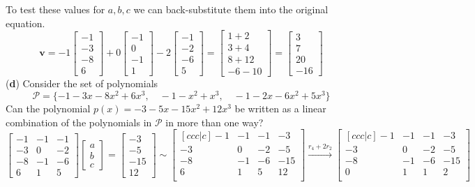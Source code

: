 \documentclass[12pt]{article}
\begin{document}
To test these values for $a,b,c$ we can back-substitute them into the original equation.
$$
\mathbf{v}=
-1
\begin{bmatrix}
   -1 \\
   -3 \\
   -8 \\
   6
\end{bmatrix}
+0
\begin{bmatrix}
   -1 \\
   0 \\
   -1 \\
   1
\end{bmatrix}
-2
\begin{bmatrix}
   -1 \\
   -2 \\
   -6 \\
   5
\end{bmatrix}
=
\begin{bmatrix}
   1 + 2 \\
   3 + 4 \\
   8 + 12 \\
   -6 -10
\end{bmatrix}
=
\begin{bmatrix}
   3 \\
   7 \\
   20 \\
   -16
\end{bmatrix}
$$
(\textbf{d}) Consider the set of polynomials
$$
\mathcal{P}=\{-1-3x-8x^2+6x^3,\quad -1-x^2+x^3,\quad -1-2x-6x^2+5x^3\}
$$
Can the polynomial $p(x)=-3-5x-15x^2+12x^3$ be written as a linear combination of the polynomials in $\mathcal{P}$ in more than one way? 
$$
\begin{bmatrix}
   -1 & -1 & -1\\
   -3 & 0 & -2\\
   -8 & -1 & -6\\
   6 & 1 & 5
\end{bmatrix}
\begin{bmatrix}
  a \\
  b \\
  c
\end{bmatrix}
=
\begin{bmatrix}
   -3 \\
   -5 \\
   -15 \\
   12 
\end{bmatrix}
\sim
\begin{bmatrix}[ccc|c]
   -1 & -1 & -1 & -3 \\
   -3 & 0 & -2 & -5 \\
   -8 & -1 & -6 & -15 \\
   6 & 1 & 5 & 12 \\
\end{bmatrix} \overset{r_4+2r_2}{\longrightarrow}
\begin{bmatrix}[ccc|c]
   -1 & -1 & -1 & -3 \\
   -3 & 0 & -2 & -5 \\
   -8 & -1 & -6 & -15 \\
   0 & 1 & 1 & 2 \\
\end{bmatrix}
$$
\end{document}
